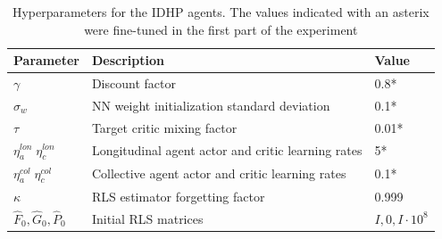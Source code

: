 \begin{table}[h]
    \centering
    \caption{Hyperparameters for the IDHP agents. The values indicated with an asterix were fine-tuned in the first part of the experiment}
    \label{tab:hyperparams}
    \begin{tabular}{@{}lll@{}}
\toprule
Parameter                         & Description                                        & Value              \\ \midrule
$\gamma$                          & Discount factor                                    & 0.8*               \\
$\sigma_w$                        & NN weight initialization standard deviation        & 0.1*               \\
$\tau$                            & Target critic mixing factor                        & 0.01*              \\
$\eta^{lon}_{a} \; \eta^{lon}_c$  & Longitudinal agent actor and critic learning rates & 5*                 \\
$\eta^{col}_{a} \; \eta^{col}_c$  & Collective agent actor and critic learning rates                    & 0.1*               \\
$\kappa$                          & RLS estimator forgetting factor                    & 0.999              \\
$\hat{F}_0, \hat{G}_0, \hat{P}_0$ & Initial RLS matrices                               & $I, 0, I\cdot10^8$ \\ \bottomrule
\end{tabular}
\end{table}
